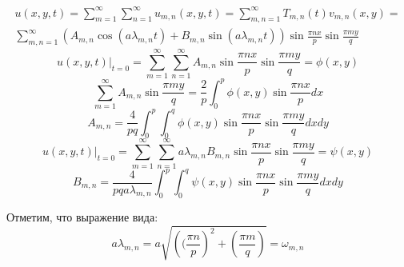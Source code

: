 \documentclass[a4paper]{article}
\begin{document}
\begin{multline}
    u(x,y,t) = \sum_{m=1}^{\infty} \sum_{n=1}^{\infty} u_{m,n}(x,y,t) = 
    \sum_{m,n=1}^{\infty} T_{m,n}(t)v_{m,n}(x,y) =\\
    \sum_{m,n=1}^{\infty}
    (A_{m,n} \cos(a \lambda_{m,n} t) + B_{m,n} \sin(a \lambda_{m,n} t)) 
    \sin \frac{\pi nx}{p} \sin \frac{\pi my}{q} 
\end{multline}
\[
    u(x,y,t)|_{t=0} = \sum_{m=1}^{\infty} \sum_{n=1}^{\infty} A_{m,n}
    \sin \frac{\pi nx}{p} \sin \frac{\pi my}{q} = \phi(x,y) 
\]
\[
    \sum_{m=1}^{\infty} A_{m,n} \sin \frac{\pi my}{q} = \frac{2}{p} 
    \int_{0}^{p} \phi(x,y) \sin \frac{\pi nx}{p} dx
\]
\begin{equation}
    A_{m,n} = \frac{4}{pq} \int_{0}^{p} \int_{0}^{q} \phi(x,y) \sin \frac{\pi nx}{p} 
    \sin \frac{\pi my}{q} dx dy
\end{equation}
\[
    u(x,y,t)|_{t=0} = \sum_{m=1}^{\infty} \sum_{n=1}^{\infty} a\lambda_{m,n} B_{m,n}
    \sin \frac{\pi nx}{p} \sin \frac{\pi my}{q} = \psi(x,y) 
\]
\begin{equation}
    B_{m,n} = \frac{4}{pqa \lambda_{m,n}} \int_{0}^{p} \int_{0}^{q} 
    \psi(x,y) \sin \frac{\pi nx}{p} \sin \frac{\pi my}{q} dxdy
\end{equation}

Отметим, что выражение вида:
\[
    a \lambda_{m,n} = a \sqrt{\left((\frac{\pi n}{p}\right)^2 + 
    \left(\frac{\pi m}{q}\right)} = \omega_{m,n}
\]
\end{document}
